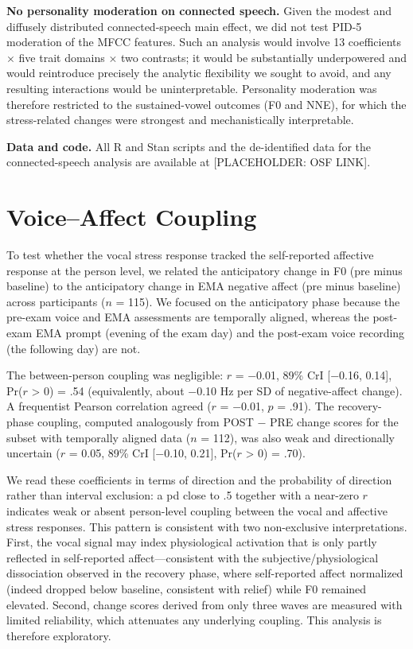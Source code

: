 \documentclass[
  english,
  man,floatsintext]{apa6}
\begin{document}
\textbf{No personality moderation on connected speech.} Given the modest and diffusely distributed connected-speech main effect, we did not test PID-5 moderation of the MFCC features. Such an analysis would involve 13 coefficients \(\times\) five trait domains \(\times\) two contrasts; it would be substantially underpowered and would reintroduce precisely the analytic flexibility we sought to avoid, and any resulting interactions would be uninterpretable. Personality moderation was therefore restricted to the sustained-vowel outcomes (F0 and NNE), for which the stress-related changes were strongest and mechanistically interpretable.

\textbf{Data and code.} All R and Stan scripts and the de-identified data for the connected-speech analysis are available at {[}PLACEHOLDER: OSF LINK{]}.

\newpage

\section{Voice--Affect Coupling}\label{voiceaffect-coupling}

To test whether the vocal stress response tracked the self-reported affective response at the person level, we related the anticipatory change in F0 (pre minus baseline) to the anticipatory change in EMA negative affect (pre minus baseline) across participants (\(n\) = 115). We focused on the anticipatory phase because the pre-exam voice and EMA assessments are temporally aligned, whereas the post-exam EMA prompt (evening of the exam day) and the post-exam voice recording (the following day) are not.

The between-person coupling was negligible: \(r\) = −0.01, 89\% CrI {[}−0.16, 0.14{]}, Pr(\(r\) \textgreater{} 0) = .54 (equivalently, about −0.10 Hz per SD of negative-affect change). A frequentist Pearson correlation agreed (\(r\) = −0.01, \(p\) = .91). The recovery-phase coupling, computed analogously from POST − PRE change scores for the subset with temporally aligned data (\(n\) = 112), was also weak and directionally uncertain (\(r\) = 0.05, 89\% CrI {[}−0.10, 0.21{]}, Pr(\(r\) \textgreater{} 0) = .70).

We read these coefficients in terms of direction and the probability of direction rather than interval exclusion: a pd close to .5 together with a near-zero \(r\) indicates weak or absent person-level coupling between the vocal and affective stress responses. This pattern is consistent with two non-exclusive interpretations. First, the vocal signal may index physiological activation that is only partly reflected in self-reported affect---consistent with the subjective/physiological dissociation observed in the recovery phase, where self-reported affect normalized (indeed dropped below baseline, consistent with relief) while F0 remained elevated. Second, change scores derived from only three waves are measured with limited reliability, which attenuates any underlying coupling. This analysis is therefore exploratory.
\end{document}
